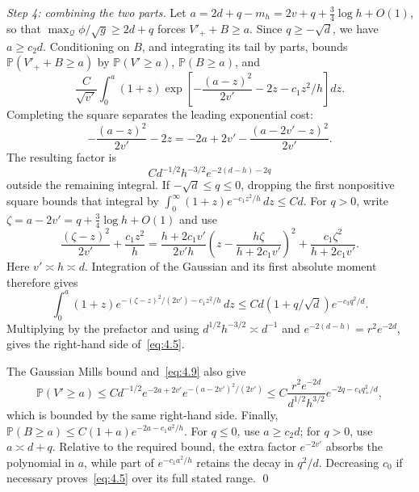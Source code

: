 \documentclass[11pt,letterpaper,reqno]{amsart}
\newif\ifrevmarks \revmarkstrue
\newcommand{\add}[1]{\ifrevmarks\textcolor{revorange}{#1}\else#1\fi}
\numberwithin{equation}{section}
\theoremstyle{remark}
\begin{document}
\add{\emph{Step 4: combining the two parts.}} Let $a=2d+q-m_h=2v+q+\tfrac34\log h+O(1)$\add{, so that $\max_{\mathcal Q}\phi/\sqrt g\ge2d+q$ forces $V'_++B\ge a$}. Since $q\ge-\sqrt d$, we have $a\ge c_2d$. Conditioning on $B$, and integrating its tail by parts, bounds
$\mathbb P(V'_++B\ge a)$ by $\mathbb P(V'\ge a)$, $\mathbb P(B\ge a)$, and
\begin{equation}\label{eq:4.8}
\frac C{\sqrt{v'}}\int_0^a(1+z)
\exp\left[-\frac{(a-z)^2}{2v'}-2z-c_1z^2/h\right]dz.
\end{equation}
Completing the square separates the leading exponential cost:
\begin{equation}\label{eq:4.9}
-\frac{(a-z)^2}{2v'}-2z
=-2a+2v'-\frac{(a-2v'-z)^2}{2v'}.
\end{equation}
The resulting factor is
\[
C d^{-1/2}h^{-3/2}e^{-2(d-h)-2q}
\]
outside the remaining integral. If $-\sqrt d\le q\le0$, dropping the first nonpositive square bounds that integral by
$\int_0^\infty(1+z)e^{-c_1z^2/h}\,dz\le Cd$.
For $q>0$, write $\zeta=a-2v'=q+\tfrac34\log h+O(1)$ and use
\begin{equation}\label{eq:terminal-double-square}
\frac{(\zeta-z)^2}{2v'}+\frac{c_1z^2}{h}
=\frac{h+2c_1v'}{2v'h}
 \left(z-\frac{h\zeta}{h+2c_1v'}\right)^2
 +\frac{c_1\zeta^2}{h+2c_1v'}.
\end{equation}
Here $v'\asymp h\asymp d$. Integration of the Gaussian and its first absolute moment therefore gives
\[
\int_0^a(1+z)
 e^{-(\zeta-z)^2/(2v')-c_1z^2/h}\,dz
\le Cd(1+q/\sqrt d)e^{-c_3q^2/d}.
\]
Multiplying by the prefactor and using
$d^{1/2}h^{-3/2}\asymp d^{-1}$ and
$e^{-2(d-h)}=r^2e^{-2d}$, gives the right-hand side of~\eqref{eq:4.5}.

The Gaussian Mills bound and~\eqref{eq:4.9} also give
\[
\mathbb P(V'\ge a)
\le C d^{-1/2}e^{-2a+2v'}
 e^{-(a-2v')^2/(2v')}
\le C\frac{r^2e^{-2d}}{d^{1/2}h^{3/2}}
 e^{-2q-c_4q_+^2/d},
\]
which is bounded by the same right-hand side. Finally,
$\mathbb P(B\ge a)\le C(1+a)e^{-2a-c_1a^2/h}$.
For $q\le0$, use $a\ge c_2d$; for $q>0$, use $a\asymp d+q$. Relative to the required bound, the extra factor $e^{-2v'}$ absorbs the polynomial in $a$, while part of $e^{-c_1a^2/h}$ retains the decay in $q^2/d$. Decreasing $c_0$ if necessary proves~\eqref{eq:4.5} over its full stated range.
\qed
\end{document}

